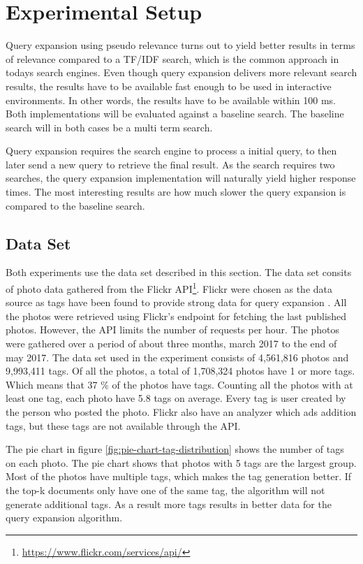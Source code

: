 \section{Experimental Setup}
Query expansion using pseudo relevance turns out to yield better results in terms of relevance compared to a TF/IDF search,
which is the common approach in todays search engines.
Even though query expansion delivers more relevant search results,
the results have to be available fast enough to be used in interactive environments.
In other words, the results have to be available within 100 ms.
Both implementations will be evaluated against a baseline search.
The baseline search will in both cases be a multi term search.

Query expansion requires the search engine to process a initial query,
to then later send a new query to retrieve the final result.
As the search requires two searches,
the query expansion implementation will naturally yield higher response times.
The most interesting results are how much slower the query expansion is compared to the baseline search.

\subsection{Data Set}
\label{sec:dataset}
Both experiments use the data set described in this section.
The data set consits of photo data gathered from the Flickr API\footnote{\url{https://www.flickr.com/services/api/}}.
Flickr were chosen as the data source as tags have been found to provide strong data for query expansion \cite{ir-hashtag}.
All the photos were retrieved using Flickr's endpoint for fetching the last published photos.
However, the API limits the number of requests per hour.
The photos were gathered over a period of about three months, march 2017 to the end of may 2017.
The data set used in the experiment consists of 4,561,816 photos and 9,993,411 tags.
Of all the photos, a total of 1,708,324 photos have 1 or more tags.
Which means that 37 \% of the photos have tags.
Counting all the photos with at least one tag,
each photo have 5.8 tags on average.
Every tag is user created by the person who posted the photo.
Flickr also have an analyzer which ads addition tags,
but these tags are not available through the API.

The pie chart in figure \ref{fig:pie-chart-tag-distribution} shows the number of tags on each photo.
The pie chart shows that photos with 5 tags are the largest group.
Most of the photos have multiple tags,
which makes the tag generation better.
If the top-k documents only have one of the same tag,
the algorithm will not generate additional tags.
As a result more tags results in better data for the query expansion algorithm.

